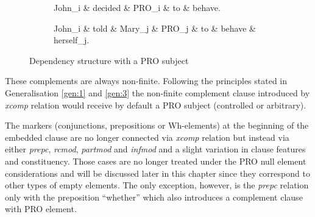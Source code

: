 \begin{figure}[!ht]
    \centering
    \begin{subfigure}[t]{0.45\linewidth}
        \begin{dependency}
            \begin{deptext}[]
                John_i \& decided \& PRO_i \& to \& behave.\\
            \end{deptext}
        \end{dependency}
        \caption{}
        \label{fig:xcomp-ex1}
    \end{subfigure}

    \begin{subfigure}[t]{0.45\linewidth}
        \begin{dependency}
            \begin{deptext}[]
                John_i \& told \& Mary_j \& PRO_j \& to \& behave \& herself_j. \\
            \end{deptext}
        \end{dependency}
        \caption{}
        \label{fig:xcomp-ex2}
    \end{subfigure}
    \caption{Dependency structure with a PRO subject}
    \label{fig:xcomp-ex}
\end{figure}

These complements are always non-finite. Following the principles stated in Generalisation \ref{gen:1} and \ref{gen:3} the non-finite complement clause introduced by \textit{xcomp} relation would receive by default a PRO subject (controlled or arbitrary).

The markers (conjunctions, prepositions or Wh-elements) at the beginning of the embedded clause are no longer connected via \textit{xcomp} relation but instead via either \textit{prepc}, \textit{rcmod}, \textit{partmod} and \textit{infmod} and a slight variation in clause features and constituency. Those cases are no longer treated under the PRO null element considerations and will be discussed later in this chapter since they correspond to other types of empty elements. The only exception, however, is the \textit{prepc} relation only with the preposition ``whether'' which also introduces a complement clause with PRO element.

